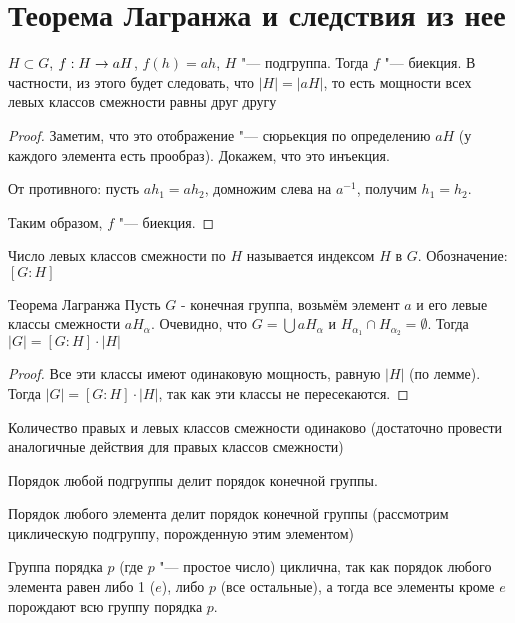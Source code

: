 \section{Теорема Лагранжа и следствия из нее}
\begin{lemma}
	$H \subset G$, $f: H \rightarrow aH$, $f(h)=ah$, $H$ "--- подгруппа. Тогда $f$ "--- биекция. В частности, из этого будет следовать, что $|H| = |aH|$, то есть мощности всех левых классов смежности равны друг другу
\end{lemma} 
\begin{proof}
	Заметим, что это отображение "--- сюрьекция по определению $aH$ (у каждого элемента есть прообраз). Докажем, что это инъекция.

	От противного: пусть $ah_1 = ah_2$, домножим слева на $a^{-1}$, получим $h_1 = h_2$.

	Таким образом, $f$ "--- биекция.
\end{proof}

\begin{Def}
	Число левых классов смежности по $H$ называется индексом $H$ в $G$. Обозначение: $[G:H]$
\end{Def}

\begin{theorem}{Теорема Лагранжа}
	Пусть $G$ - конечная группа, возьмём элемент $a$ и его левые классы смежности $aH_{\alpha}$.
	Очевидно, что $G = \bigcup aH_{\alpha}$ и $H_{\alpha_1} \cap H_{\alpha_2} = \emptyset$.
	Тогда $|G| = [G : H] \cdot |H|$
\end{theorem}
\begin{proof}
	Все эти классы имеют одинаковую мощность, равную $|H|$ (по лемме). Тогда $|G| = [G : H] \cdot |H|$, так как эти классы не пересекаются.
\end{proof}
\begin{conseq}
	Количество правых и левых классов смежности одинаково (достаточно провести аналогичные действия для правых классов смежности)
\end{conseq}
\begin{conseq}
	Порядок любой подгруппы делит порядок конечной группы.
\end{conseq}
\begin{conseq}
	Порядок любого элемента делит порядок конечной группы (рассмотрим циклическую подгруппу, порожденную этим элементом)
\end{conseq}
\begin{conseq}
	Группа порядка $p$ (где $p$ "--- простое число) циклична, так как порядок любого элемента равен либо 1 ($e$), либо $p$ (все остальные), а тогда все элементы кроме $e$ порождают всю группу порядка $p$.
\end{conseq}
